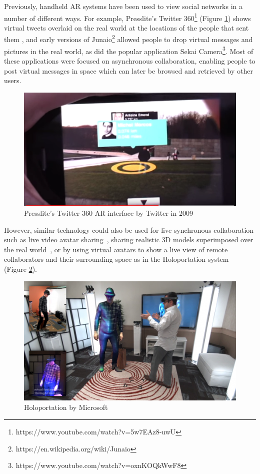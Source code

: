 Previously, handheld AR systems have been used to view social networks in a number of different ways. For example, Presslite's Twitter 360\footnote{https://www.youtube.com/watch?v=5w7EAz8-uwU} (Figure \ref{fig:presslite}) shows virtual tweets overlaid on the real world at the locations of the people that sent them , and early versions of Junaio\footnote{https://en.wikipedia.org/wiki/Junaio} allowed people to drop virtual messages and pictures in the real world, as did the popular application Sekai Camera\footnote{https://www.youtube.com/watch?v=oxnKOQkWwF8}. Most of these applications were focused on asynchronous collaboration, enabling people to post virtual messages in space which can later be browsed and retrieved by other users. 

\begin{figure}
    \centering
    \includegraphics[width=.8\linewidth]{images/Presslite-twitter-360.PNG}
    \caption{Presslite's Twitter 360 AR interface by Twitter in 2009}
    \label{fig:presslite}
\end{figure}

However, similar technology could also be used for live synchronous collaboration such as live video avatar sharing~\cite{Billinghurst2002}, sharing realistic 3D models superimposed over the real world~\cite{Fanello2016}, or by using virtual avatars to show a live view of remote collaborators and their surrounding space as in the Holoportation system~\cite{Fanello2016} (Figure \ref{fig:holoportation}).

\begin{figure}
    \centering
    \includegraphics[width=.8\linewidth]{images/holoportation.png}
    \caption{Holoportation by Microsoft \cite{Fanello2016}}
    \label{fig:holoportation}
\end{figure}

